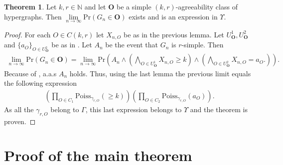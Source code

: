 \documentclass[12pt,notitlepage,a4paper]{article}
\theoremstyle{definition}
\newtheorem{theorem}{Theorem}[section]
\newcommand{\N}{\mathbb{N}}
\newcommand{\Ln}{\lim\limits_{n\to \infty}}
\newcommand{\PR}[1]{\mathrm{Pr}\left(#1\right)}
\begin{document}
\begin{theorem}\label{thm:agreeabilityprobabilities}
	Let $k,r\in \N$ and let $\mathbf{O}$ be a simple $(k,r)$-agreeability class
	of hypergraphs. Then 
	$\Ln \PR{G_n\in \mathbf{O}}$ exists and is an expression
	in $\Upsilon$. 
\end{theorem}
\begin{proof}
For each $O\in C(k,r)$ let $X_{n,O}$ be as in the previous lemma. 
Let $U_\mathbf{O}^1, U_\mathbf{O}^2$ and $\{a_O\}_{O\in U^2_\mathbf{O}}$ 
be as in . Let $A_n$ be the event that $G_n$ is $r$-simple. 
Then
\begin{align*}
 \Ln
 \PR{G_n \in \mathbf{O}}=
 \Ln
 \mathrm{Pr} \left(
 A_n \wedge
 \left(
 \bigwedge_{O\in U_\mathbf{O}^1}
 X_{n,O}\geq k
 \right)
 \wedge
 \left(
 \bigwedge_{O\in  U^2_\mathbf{O}}
 X_{n,O}=a_O.
 \right)
 \right).
\end{align*}
Because of , a.a.s $A_n$ holds. Thus, using the last
lemma the previous limit equals the following expression
\begin{align*}
\left(
\prod_{O\in C_1}
\mathrm{Poiss}_{\gamma_{r,O}}(\geq k)
\right)
\left(
\prod_{O\in C_2}
\mathrm{Poiss}_{\gamma_{r,O}}(a_O)
\right)
.
\end{align*}
As all the $\gamma_{r,O}$ belong to $\Gamma$,
this last expression belongs to $\Upsilon$ and the theorem is proven. 
\end{proof}

\section{Proof of the main theorem} \label{sect:main}
\end{document}
